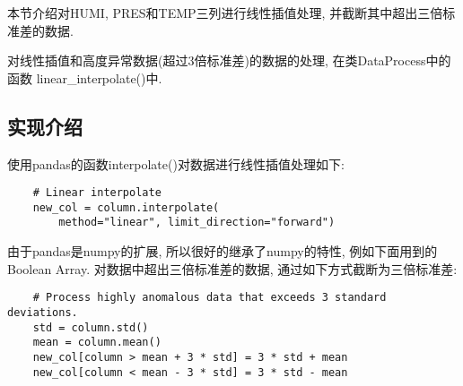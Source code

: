 本节介绍对HUMI, PRES和TEMP三列进行线性插值处理, 并截断其中超出三倍标准差的数据.\par

对线性插值和高度异常数据(超过3倍标准差)的数据的处理, 在类DataProcess中的函数
linear\_interpolate()中.\par

\subsection{实现介绍}
使用pandas的函数interpolate()对数据进行线性插值处理如下:
\begin{lstlisting}
    # Linear interpolate
    new_col = column.interpolate(
        method="linear", limit_direction="forward")
\end{lstlisting}

由于pandas是numpy的扩展, 所以很好的继承了numpy的特性, 例如下面用到的Boolean
Array.
对数据中超出三倍标准差的数据, 通过如下方式截断为三倍标准差:
\begin{lstlisting}
    # Process highly anomalous data that exceeds 3 standard deviations.
    std = column.std()
    mean = column.mean()
    new_col[column > mean + 3 * std] = 3 * std + mean
    new_col[column < mean - 3 * std] = 3 * std - mean
\end{lstlisting}

